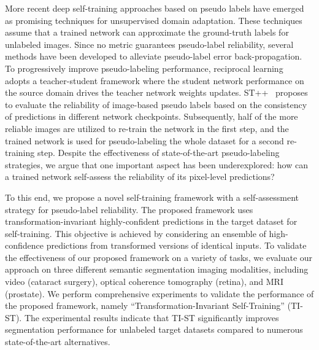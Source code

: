 More recent deep self-training approaches based on pseudo labels have emerged as promising techniques for unsupervised domain adaptation. These techniques assume that a trained network can approximate the ground-truth labels for unlabeled images. Since no metric guarantees pseudo-label reliability, several methods have been developed to alleviate pseudo-label error back-propagation. To progressively improve pseudo-labeling performance, reciprocal learning~ adopts a teacher-student framework where the student network performance on the source domain drives the teacher network weights updates. ST++~ proposes to evaluate the reliability of image-based pseudo labels based on the consistency of predictions in different network checkpoints. Subsequently, half of the more reliable images are utilized to re-train the network in the first step, and the trained network is used for pseudo-labeling the whole dataset for a second re-training step. Despite the effectiveness of state-of-the-art pseudo-labeling strategies, we argue that one important aspect has been underexplored: how can a trained network self-assess the reliability of its pixel-level predictions?

To this end, we propose a novel self-training framework with a self-assessment strategy for pseudo-label reliability. The proposed framework uses transformation-invariant highly-confident predictions in the target dataset for self-training. This objective is achieved by considering an ensemble of high-confidence predictions from transformed versions of identical inputs. To validate the effectiveness of our proposed framework on a variety of tasks, we evaluate our approach on three different semantic segmentation imaging modalities, including video (cataract surgery), optical coherence tomography (retina), and MRI (prostate). We perform comprehensive experiments to validate the performance of the proposed framework, namely ``Transformation-Invariant Self-Training'' (TI-ST). The experimental results indicate that TI-ST significantly improves segmentation performance for unlabeled target datasets compared to numerous state-of-the-art alternatives.


